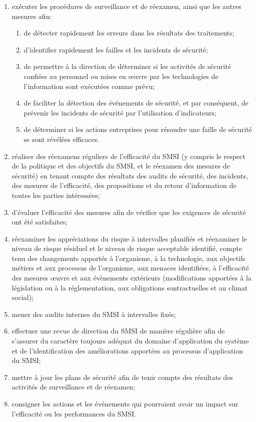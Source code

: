 \begin{enumerate}
	\item exécuter les procédures de surveillance et de réexamen, ainsi que les autres mesures afin:
	\begin{enumerate}
		\item de détecter rapidement les erreurs dans les résultats des traitements;
		\item d'identifier rapidement les failles et les incidents de sécurité;
		\item de permettre à la direction de déterminer si les activités de sécurité confiées au personnel ou mises en œuvre par les technologies de l'information sont exécutées comme prévu;
		\item de faciliter la détection des événements de sécurité, et par conséquent, de prévenir les incidents de sécurité par l'utilisation d'indicateurs;
		\item de déterminer si les actions entreprises pour résoudre une faille de sécurité se sont révélées efficaces.
	\end{enumerate}

	\item réaliser des réexamens réguliers de l'efficacité du SMSI (y compris le respect de la politique et des objectifs du SMSI, et le réexamen des mesures de sécurité) en tenant compte des résultats des audits de sécurité, des incidents, des mesures de l'efficacité, des propositions et du retour d'information de toutes les parties intéressées;

	\item d’évaluer l'efficacité des mesures afin de vérifier que les exigences de sécurité ont été satisfaites;

	\item réexaminer les appréciations du risque à intervalles planifiés et réexaminer le niveau de risque résiduel et le niveau de risque acceptable identifié, compte tenu des changements apportés à l'organisme, à la technologie, aux objectifs métiers et aux processus de l'organisme, aux menaces identifiées, à l'efficacité des mesures \oe{}uvre et aux évènements extérieurs (modifications apportées à la législation ou à la réglementation, aux obligations sontractuelles et au climat social);

	\item mener des audits internes du SMSI à intervalles fixés;

	\item effectuer une revue de direction du SMSI de manière régulière afin de s'assurer du caractère toujours adéquat du domaine d'application du système et de l'identification des améliorations apportées au processus d'application du SMSI;

	\item mettre à jour les plans de sécurité afin de tenir compte des résultats des activités de surveillance et de réexamen;

	\item consigner les actions et les événements qui pourraient avoir un impact sur l'efficacité ou les performances du SMSI.

\end{enumerate}


